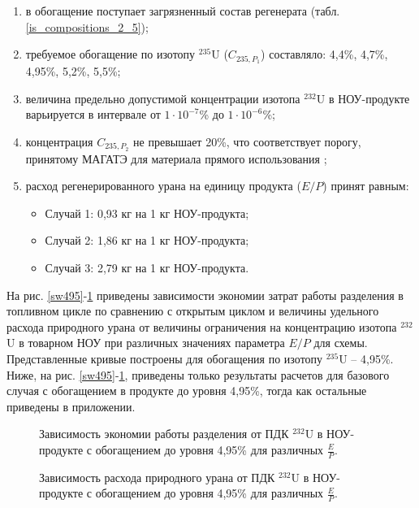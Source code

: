 \begin{enumerate}
    \item в обогащение поступает загрязненный состав регенерата (табл. \ref{is_compositions_2_5}); 
    \item требуемое обогащение по изотопу $^{235}$U ($C_{235,{P_1}}$) составляло: 4,4\%, 4,7\%, 4,95\%, 5,2\%, 5,5\%;    
    \item величина предельно допустимой концентрации изотопа $^{232}$U в НОУ-продукте варьируется в интервале от $1\cdot10^{-7}$\% до $1\cdot10^{-6}$\%;
    \item концентрация $C_{235,{P_2}}$ не превышает 20\%, что соответствует порогу, принятому МАГАТЭ для материала прямого использования \cite{alekseevConceptUseRecycled2010};
    \item расход регенерированного урана на единицу продукта ($E/P$) принят равным:
    \begin{itemize}
        \item Случай 1: 0,93 кг на 1 кг НОУ-продукта;
        \item Случай 2: 1,86 кг на 1 кг НОУ-продукта;
        \item Случай 3: 2,79 кг на 1 кг НОУ-продукта.
    \end{itemize}
\end{enumerate}

На рис. \ref{sw495}-\ref{F0R495} приведены зависимости экономии затрат работы разделения в топливном цикле по сравнению с открытым циклом и величины удельного расхода природного урана от величины ограничения на концентрацию изотопа $^{232}$U в товарном НОУ при различных значениях параметра $E/P$ для схемы. Представленные кривые построены для обогащения по изотопу $^{235}$U -- 4,95\%. Ниже, на рис. \ref{sw495}-\ref{F0R495}, приведены только результаты расчетов для базового случая с обогащением в продукте до уровня 4,95\%, тогда как остальные приведены в приложении.


\begin{figure}[ht]
    \centering
    \begin{minipage}{.5\textwidth}
      \centering
      
\caption{{Зависимость экономии работы разделения от ПДК $^{232}$U в НОУ-продукте с обогащением до уровня 4,95\% для различных $\frac{E}{P}$.{\label{sw495}}}}
    \end{minipage}%
    \begin{minipage}{.5\textwidth}
      \centering
      
    \caption{{Зависимость расхода природного урана от ПДК $^{232}$U в НОУ-продукте с обогащением до уровня 4,95\% для различных $\frac{E}{P}$.{\label{F0R495}}}}
\end{minipage}
\end{figure}


